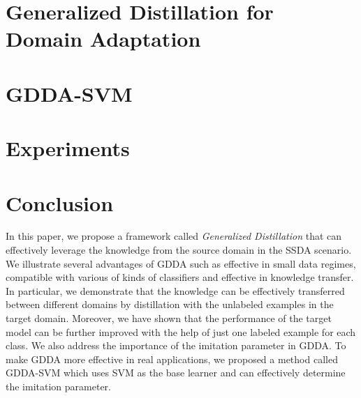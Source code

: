 \documentclass[letterpaper]{article}
\begin{document}
\section{Generalized Distillation for Domain Adaptation}\label{sec:gdda}



\section{GDDA-SVM}\label{sec:svm}


\section{Experiments}\label{sec:exp}


\section{Conclusion}\label{sec:con}
In this paper, we propose a framework called \textit{Generalized Distillation} that can effectively leverage the knowledge from the source domain in the SSDA scenario. We illustrate several advantages of GDDA such as effective in small data regimes, compatible with various of kinds of classifiers and effective in knowledge transfer. In particular, we demonstrate that the knowledge can be effectively transferred between different domains by distillation with the unlabeled examples in the target domain. Moreover, we have shown that the performance of the target model can be further improved with the help of just one labeled example for each class. We also address the importance of the imitation parameter in GDDA. To make GDDA more effective in real applications, we proposed a method called GDDA-SVM which uses SVM as the base learner and can effectively determine the imitation parameter. 


\end{document}
